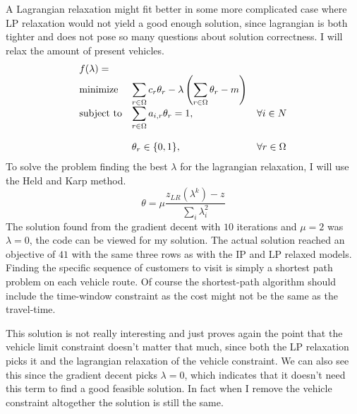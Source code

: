 \documentclass{article}
\begin{document}
    A Lagrangian relaxation might fit better in some more complicated case where LP relaxation would not yield a good enough solution, since lagrangian is both tighter and does not pose so many questions about solution correctness.
    I will relax the amount of present vehicles.
    \begin{equation*}
        \begin{array}{ll@{}ll}
            f(\lambda) =& \\
            \text{minimize}  & \displaystyle\sum_{r \in \Omega} c_r \theta_r - \lambda \left( \sum_{r \in \Omega} \theta_r - m \right)& &\\
            \text{subject to}& \displaystyle\sum_{r \in \Omega} a_{i, r} \theta_r = 1 ,&   &\forall i \in N\\\\
            & \displaystyle \theta_r  \in \{0,1\},  && \forall r \in \Omega
        \end{array}
    \end{equation*}
    To solve the problem finding the best $\lambda$ for the lagrangian relaxation, I will use the Held and Karp method.
    \[
        \theta = \mu \frac{z_{LR}(\lambda^k) - z}{\sum_i \lambda^2_i}
    \]
    The solution found from the gradient decent with $10$ iterations and $\mu=2$ was $\lambda = 0$, the code can be viewed for my solution.
    The actual solution reached an objective of $41$ with the same three rows as with the IP and LP relaxed models.
    Finding the specific sequence of customers to visit is simply a shortest path problem on each vehicle route.
    Of course the shortest-path algorithm should include the time-window constraint as the cost might not be the same as the travel-time.

    This solution is not really interesting and just proves again the point that the vehicle limit constraint doesn't matter that much, since both the LP relaxation picks it and the lagrangian relaxation of the vehicle constraint.
    We can also see this since the gradient decent picks $\lambda = 0$, which indicates that it doesn't need this term to find a good feasible solution.
    In fact when I remove the vehicle constraint altogether the solution is still the same.
\end{document}
